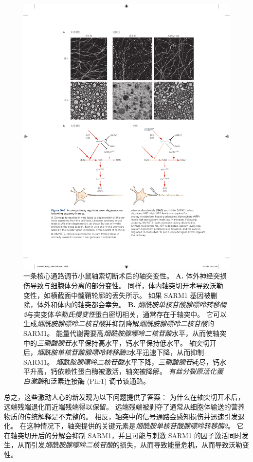 \begin{figure}[htbp]
	\centering
	\includegraphics[width=0.9\linewidth]{chap50/fig_50_3}
	\caption{一条核心通路调节小鼠轴索切断术后的轴突变性。
		\textbf{A.} 体外神经突损伤导致与细胞体分离的部分变性。
		同样，体内轴突切开术导致沃勒变性，如横截面中髓鞘轮廓的丢失所示。
		如果 SARM1 基因被删除，体外和体内的轴突都会幸免。
		\textbf{B.} \textit{烟酰胺单核苷酸腺嘌呤转移酶2}与突变体\textit{华勒氏慢变性}蛋白密切相关，通常存在于轴突中。
		它可以生成\textit{烟酰胺腺嘌呤二核苷酸}并抑制降解\textit{烟酰胺腺嘌呤二核苷酸}的 SARM1。
		能量代谢需要高\textit{烟酰胺腺嘌呤二核苷酸}水平，从而使轴突中的\textit{三磷酸腺苷}水平保持高水平，钙水平保持低水平。
		轴突切开后，\textit{烟酰胺单核苷酸腺嘌呤转移酶2}水平迅速下降，从而抑制 SARM1。
		\textit{烟酰胺腺嘌呤二核苷酸}水平下降，\textit{三磷酸腺苷}耗尽，钙水平升高，钙依赖性蛋白酶被激活，轴突被降解。
		\textit{有丝分裂原活化蛋白激酶}和泛素连接酶 (Phr1) 调节该通路。}
	\label{fig:50_3}
\end{figure}


总之，这些激动人心的新发现为以下问题提供了答案：
为什么在轴突切开术后，远端残端退化而近端残端得以保留。
远端残端被剥夺了通常从细胞体输送的营养物质的传统解释是不完整的。
相反，轴突中的信号通路会感知损伤并迅速引发退化。
在这种情况下，轴突提供的关键元素是\textit{烟酰胺单核苷酸腺嘌呤转移酶2}。
它在轴突切开后的分解会抑制 SARM1，并且可能与刺激 SARM1 的因子激活同时发生，从而引发\textit{烟酰胺腺嘌呤二核苷酸}的损失，从而导致能量危机，从而导致沃勒变性。


